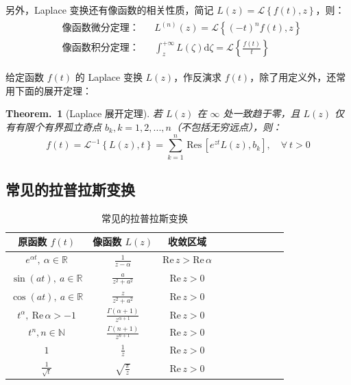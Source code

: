 \documentclass[UTF8]{report}
\def\Re{\mathrm{Re\,}}
\def\Res{\mathrm{\,Res\,}}
\def\N{\mathbb{N}}
\def\R{\mathbb{R}}
\theoremstyle{MyLineTheoremStyle} %
\theoremstyle{MyBlockTheoremStyle} %
\newtheorem{BlockTheorem}[LineTheorem]{Theorem.\,} %
\theoremstyle{MySubsubsectionStyle} %
\begin{document}
另外，Laplace 变换还有像函数的相关性质，简记 $L(z) = \mathscr{L}\left\{ f(t), z \right\}$，则：
\begin{gather}
\begin{aligned}
&\text{像函数微分定理：} && L^{(n)}(z) = \mathscr{L}\left\{ (-t)^n f(t), z \right\} \\ 
&\text{像函数积分定理：} && \int_{z}^{+\infty} L(\zeta)\mathrm{d}\zeta = \mathscr{L}\left\{ \frac{f(t)}{t} \right\}
\end{aligned} 
\end{gather}

给定函数 $f(t)$ 的 Laplace 变换 $L(z)$，作反演求 $f(t)$，除了用定义外，还常用下面的展开定理：
\begin{BlockTheorem}[Laplace 展开定理]\label{Laplace 展开定理}
若 $L(z)$ 在 $\infty$ 处一致趋于零，且 $L(z)$ 仅有有限个有界孤立奇点 $b_k, k = 1, 2, ..., n$（不包括无穷远点），则：
\begin{equation}
f(t) = \mathscr{L}^{-1}\left\{ L(z), t \right\} = 
\sum_{k=1}^{n} \Res \left[ e^{zt}L(z), b_k \right],\quad \forall\ t > 0
\end{equation}
\end{BlockTheorem}



\subsection{常见的拉普拉斯变换}

\begin{table}[H]\centering \everymath{\displaystyle}
    \renewcommand{\arraystretch}{1.75} %
    \caption{常见的拉普拉斯变换}
    \label{常见的拉普拉斯变换}
\begin{tabular}{cccccccccc}\toprule
    原函数 $f(t)$ & 像函数 $L(z)$ & 收敛区域  \\
    \midrule
    $e^{\alpha t}, \ \alpha \in \R$ & $\frac{1}{z - \alpha}$ & $\Re z > \Re \alpha$  \\
    $\sin (a t),\ a \in \R$ & $\frac{a}{z^2 + a^2}$ & $\Re z > 0$  \\
    $\cos (a t),\ a \in \R$ & $\frac{z}{z^2 + a^2}$ & $\Re z > 0$  \\
    $t^\alpha,\ \Re \alpha > -1$ & $\frac{\Gamma(\alpha + 1)}{z^{\alpha + 1}}$ & $\Re z > 0$ \\ 
    $t^n, n \in \N$ & $\frac{\Gamma(n + 1)}{z^{n+1}}$ & $\Re z > 0$ \\ 
    $1$ & $\frac{1}{z}$ & $\Re z > 0$ \\ 
    $\frac{1}{\sqrt{t}}$ & $\sqrt{\frac{\pi}{z}}$ & $\Re z > 0$ \\ 
    \bottomrule
\end{tabular}
\end{table}
\end{document}
